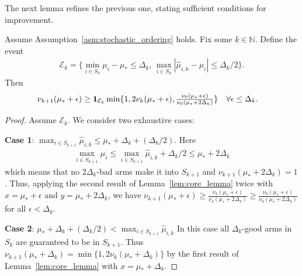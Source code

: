 \noindent The next lemma refines the previous one, stating sufficient conditions for  improvement. 
\begin{lemma}\label{lem:E_k}
Assume Assumption~\ref{asm:stochastic_ordering} holds.
Fix some $k \in \mathbb{N}$. 
Define the event
\begin{align*}
\mathcal{E}_k = \{ \min_{i\in S_k} \mu_i-\mu_* \leq \Delta_k, \, \max_{i\in S_k} |\widehat{\mu}_{i,k} - \mu_i| \leq \Delta_k/2\}.
\end{align*} 
Then
\begin{align} 
\nu_{k+1}(\mu_*+\epsilon) &\geq \mathbf{1}_{\mathcal{E}_k}\min\{ 1, 2 \nu_k(\mu_*+\epsilon) , \tfrac{\nu_0(\mu_*+\epsilon) }{\nu_0(\mu_* + 2\Delta_k)} \} \quad \forall \epsilon \leq \Delta_k. \label{eqn:recursion}
\end{align}
\end{lemma}
\begin{proof}
Assume $\mathcal{E}_k$.
We consider two exhaustive cases: 

\noindent\textbf{Case 1}: $\max_{i \in S_{k+1}} \widehat{\mu}_{i,k} \leq \mu_* + \Delta_k + (\Delta_k/2)$. Here 
\begin{align*}
\max_{i \in S_{k+1}} \mu_i \leq \max_{i \in S_{k+1}} \widehat{\mu}_{i,k} + \Delta_k/2 \leq \mu_* + 2 \Delta_k
\end{align*} 
which means that no $2\Delta_k$-bad arms make it into $S_{k+1}$ and $\nu_{k+1}(\mu_*+2\Delta_k)=1$. Thus, applying the second result of Lemma~\ref{lem:core_lemma} twice with $x = \mu_* + \epsilon$ and $y=\mu_* + 2 \Delta_k$, we have $\nu_{k+1}(\mu_* + \epsilon) \geq \frac{\nu_k(\mu_*+\epsilon)}{\nu_k(\mu_* + 2\Delta_k)} \geq \frac{\nu_0(\mu_*+\epsilon)}{\nu_0(\mu_* + 2\Delta_k)}$ for all $\epsilon < \Delta_k$.

\noindent\textbf{Case 2}: $\mu_* + \Delta_k + (\Delta_k/2) < \max_{i \in S_{k+1}} \widehat{\mu}_{i,k}$ In this case all $\Delta_k$-good arms in $S_k$ are guaranteed to be in $S_{k+1}$. Thus $\nu_{k+1}(\mu_*+\Delta_k) = \min\{1,2 \nu_{k}(\mu_* + \Delta_k)\}$ by the first result of Lemma~\ref{lem:core_lemma} with $x = \mu_* +\Delta_k$.
\end{proof}

